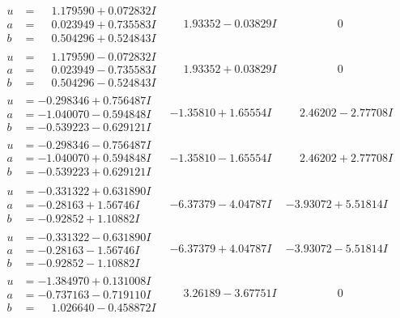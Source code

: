 \documentclass[1p]{elsarticle_modified}
\theoremstyle{definition}
\begin{document}
$$\begin{array}{c|c|c}
\begin{aligned}
u &= \phantom{-}1.179590 + 0.072832 I \\
a &= \phantom{-}0.023949 + 0.735583 I \\
b &= \phantom{-}0.504296 + 0.524843 I\end{aligned}
 & \phantom{-}1.93352 - 0.03829 I & \phantom{-0.000000 } 0 \\ \hline\begin{aligned}
u &= \phantom{-}1.179590 - 0.072832 I \\
a &= \phantom{-}0.023949 - 0.735583 I \\
b &= \phantom{-}0.504296 - 0.524843 I\end{aligned}
 & \phantom{-}1.93352 + 0.03829 I & \phantom{-0.000000 } 0 \\ \hline\begin{aligned}
u &= -0.298346 + 0.756487 I \\
a &= -1.040070 - 0.594848 I \\
b &= -0.539223 - 0.629121 I\end{aligned}
 & -1.35810 + 1.65554 I & \phantom{-}2.46202 - 2.77708 I \\ \hline\begin{aligned}
u &= -0.298346 - 0.756487 I \\
a &= -1.040070 + 0.594848 I \\
b &= -0.539223 + 0.629121 I\end{aligned}
 & -1.35810 - 1.65554 I & \phantom{-}2.46202 + 2.77708 I \\ \hline\begin{aligned}
u &= -0.331322 + 0.631890 I \\
a &= -0.28163 + 1.56746 I \\
b &= -0.92852 + 1.10882 I\end{aligned}
 & -6.37379 - 4.04787 I & -3.93072 + 5.51814 I \\ \hline\begin{aligned}
u &= -0.331322 - 0.631890 I \\
a &= -0.28163 - 1.56746 I \\
b &= -0.92852 - 1.10882 I\end{aligned}
 & -6.37379 + 4.04787 I & -3.93072 - 5.51814 I \\ \hline\begin{aligned}
u &= -1.384970 + 0.131008 I \\
a &= -0.737163 - 0.719110 I \\
b &= \phantom{-}1.026640 - 0.458872 I\end{aligned}
 & \phantom{-}3.26189 - 3.67751 I & \phantom{-0.000000 } 0 \\ \hline\begin{aligned}

\end{aligned}
\end{array}$$
\end{document}
